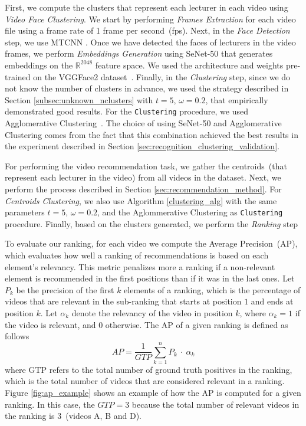 First, we compute the clusters that represent each lecturer in each video using \emph{Video Face Clustering}. 
We start by performing \emph{Frames Extraction} for each video file using a frame rate of 1 frame per second~(fps). 
Next, in the \emph{Face Detection} step, we use MTCNN \cite{mtcnn}.
Once we have detected the faces of lecturers in the video frames, we perform \emph{Embeddings Generation} using SeNet-50 \cite{senet} that generates embeddings on the $\mathbb{R}^{2048}$ feature space. 
We used the architecture and weights pre-trained on the VGGFace2 dataset~\cite{cao2018vggface2}.
Finally, in the \emph{Clustering} step, since we do not know the number of clusters in advance, we used the strategy described in Section \ref{subsec:unknown_nclusters} with $t=5$, $\omega=0.2$, that empirically demonstrated good results. For the \texttt{Clustering} procedure, we used Agglomerative Clustering~\cite{ward1963hierarchical}.
The choice of using SeNet-50 and Agglomerative Clustering comes from the fact that this combination achieved the best results in the experiment described in Section \ref{sec:recognition_clustering_validation}.

For performing the video recommendation task, we gather the centroids~(that represent each lecturer in the video) from all videos in the dataset. Next, we perform the process described in Section \ref{sec:recommendation_method}. For \emph{Centroids Clustering}, we also use Algorithm \ref{clustering_alg} with the same parameters $t=5$, $\omega=0.2$, and the Aglommerative Clustering as \texttt{Clustering} procedure. Finally, based on the clusters generated, we perform the \emph{Ranking} step

To evaluate our ranking, for each video we compute the Average Precision~(AP), which evaluates how well a ranking of recommendations is based on each element's relevancy. 
This metric penalizes more a ranking if a non-relevant element is recommended in the first positions than if it was in the last ones.
Let $P_k$ be the precision of the first $k$ elements of a ranking, which is the percentage of videos that are relevant in the sub-ranking that starts at position $1$ and ends at position $k$.
Let $\alpha_k$ denote the relevancy of the video in position $k$, where $\alpha_k = 1$ if the video is relevant, and $0$ otherwise.
The AP of a given ranking is defined as follows
\begin{equation}
  \label{equation:average_precision}
  AP = \frac{1}{GTP}\sum_{k=1}^{n}{P_k~\cdot~\alpha_k}
\end{equation}
where GTP refers to the total number of ground truth positives in the ranking, which is the total number of videos that are considered relevant in a ranking. Figure \ref{fig:ap_example} shows an example of how the AP is computed for a given ranking. In this case, the $GTP=3$ because the total number of relevant videos in the ranking is 3~(videos A, B and D).


